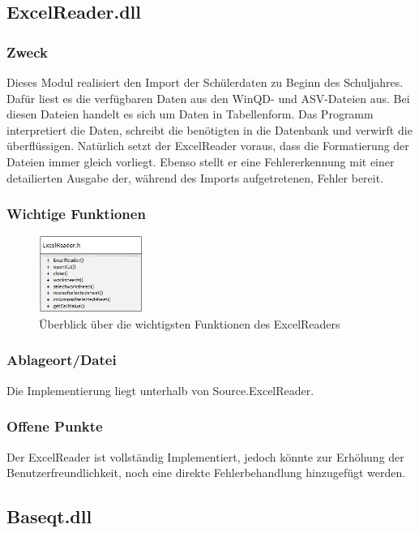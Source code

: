 \subsection{ExcelReader.dll}
\subsubsection{Zweck}
Dieses Modul realisiert den Import der Schülerdaten zu Beginn des Schuljahres. Dafür 
liest es die verfügbaren Daten aus den WinQD- und ASV-Dateien aus. Bei diesen Dateien
handelt es sich um Daten in Tabellenform. Das Programm interpretiert die Daten, schreibt
die benötigten in die Datenbank und verwirft die überflüssigen. Natürlich setzt der 
ExcelReader voraus, dass die Formatierung der Dateien immer gleich vorliegt. Ebenso 
stellt er eine Fehlererkennung mit einer detailierten Ausgabe der, während des Imports
aufgetretenen, Fehler bereit.    
\subsubsection{Wichtige Funktionen}
\begin{figure}[H]
	\centering
		\includegraphics[width=0.30\textwidth]{figures/ExcelReader.jpg}
	\caption{Überblick über die wichtigsten Funktionen des ExcelReaders}
	\label{fig:ExcelReader}
\end{figure}
\subsubsection{Ablageort/Datei}
Die Implementierung liegt unterhalb von Source.ExcelReader.
\subsubsection{Offene Punkte}
Der ExcelReader ist vollständig Implementiert, jedoch könnte zur Erhöhung der Benutzerfreundlichkeit, noch eine direkte Fehlerbehandlung hinzugefügt werden.


\subsection{Baseqt.dll}
